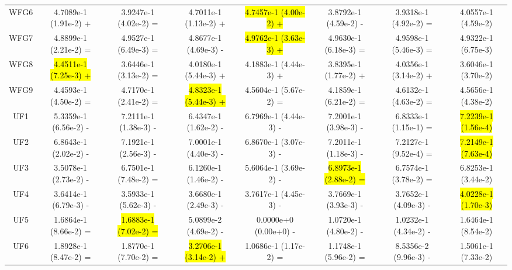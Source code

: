 \documentclass[journal]{IEEEtran}
\begin{document}
\begin{table}[tbp]
{\begin{tabular}{cccccccc}
            WFG6    & 4.7089e-1 (1.91e-2) +      & 3.9247e-1 (4.02e-2) =      & 4.7011e-1 (1.13e-2) +      & \hl{4.7457e-1 (4.00e-2) +} & 3.8792e-1 (4.59e-2) -      & 3.9318e-1 (4.92e-2) =      & 4.0557e-1 (4.59e-2)      \\
            WFG7    & 4.8899e-1 (2.21e-2) =      & 4.9527e-1 (6.49e-3) =      & 4.8677e-1 (4.69e-3) -      & \hl{4.9762e-1 (3.63e-3) +} & 4.9630e-1 (6.18e-3) =      & 4.9598e-1 (5.46e-3) =      & 4.9322e-1 (6.75e-3)      \\
            WFG8    & \hl{4.4511e-1 (7.25e-3) +} & 3.6446e-1 (3.13e-2) =      & 4.0180e-1 (5.44e-3) +      & 4.1883e-1 (4.44e-3) +      & 3.8395e-1 (1.77e-2) +      & 4.0356e-1 (3.14e-2) +      & 3.6046e-1 (3.70e-2)      \\
            WFG9    & 4.4593e-1 (4.50e-2) =      & 4.7170e-1 (2.41e-2) =      & \hl{4.8323e-1 (5.44e-3) +} & 4.5604e-1 (5.67e-2) =      & 4.1859e-1 (6.21e-2) =      & 4.6132e-1 (4.63e-2) =      & 4.5656e-1 (4.38e-2)      \\
            \hline
            UF1     & 5.3359e-1 (6.56e-2) -      & 7.2111e-1 (1.38e-3) -      & 6.4347e-1 (1.62e-2) -      & 6.7969e-1 (4.44e-3) -      & 7.2001e-1 (3.98e-3) -      & 6.8333e-1 (1.15e-1) =      & \hl{7.2239e-1 (1.56e-4)} \\
            UF2     & 6.8643e-1 (2.02e-2) -      & 7.1921e-1 (2.56e-3) -      & 7.0001e-1 (4.40e-3) -      & 6.8670e-1 (3.07e-3) -      & 7.2011e-1 (1.18e-3) -      & 7.2127e-1 (9.52e-4) =      & \hl{7.2149e-1 (7.63e-4)} \\
            UF3     & 3.5078e-1 (2.73e-2) -      & 6.7501e-1 (7.48e-2) =      & 6.1260e-1 (1.46e-2) -      & 5.6064e-1 (3.69e-2) -      & \hl{6.8973e-1 (2.88e-2) =} & 6.7574e-1 (3.78e-2) =      & 6.8253e-1 (3.44e-2)      \\
            UF4     & 3.6414e-1 (6.79e-3) -      & 3.5933e-1 (5.62e-3) -      & 3.6680e-1 (2.49e-3) -      & 3.7617e-1 (4.45e-3) -      & 3.7669e-1 (3.93e-3) -      & 3.7652e-1 (4.09e-3) -      & \hl{4.0228e-1 (1.70e-3)} \\
            UF5     & 1.6864e-1 (8.66e-2) =      & \hl{1.6883e-1 (7.02e-2) =} & 5.0899e-2 (4.69e-2) -      & 0.0000e+0 (0.00e+0) -      & 1.0720e-1 (4.80e-2) -      & 1.0232e-1 (4.34e-2) -      & 1.6464e-1 (8.54e-2)      \\
            UF6     & 1.8928e-1 (8.47e-2) =      & 1.8770e-1 (7.70e-2) =      & \hl{3.2706e-1 (3.14e-2) +} & 1.0686e-1 (1.17e-2) =      & 1.1748e-1 (5.96e-2) =      & 8.5356e-2 (9.96e-3) -      & 1.5061e-1 (7.33e-2)      \\

\end{tabular}}
\end{table}
\end{document}
